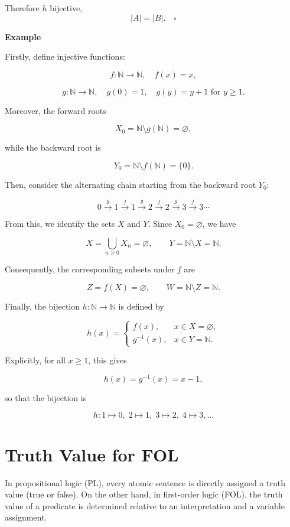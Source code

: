 \documentclass[12pt,a4paper,openany]{article}
\begin{document}
Therefore $h$ bijective,  
\[
|A|=|B|. \quad \square
\]

\textbf{Example}

Firstly, define injective functions:

\[
f: \mathbb{N} \to \mathbb{N}, \quad f(x) = x,
\]

\[
g: \mathbb{N} \to \mathbb{N}, \quad g(0) = 1, \quad g(y) = y+1 \text{ for } y \ge 1.
\]

Moreover, the forward roots

\[
X_0 = \mathbb{N} \setminus g(\mathbb{N}) = \varnothing,
\]

while the backward root is

\[
Y_0 = \mathbb{N} \setminus f(\mathbb{N}) = \{0\}.
\]

Then, consider the alternating chain starting from the backward root $Y_0$:

\[
0 \xrightarrow{\,g\,} 1 \xrightarrow{\,f\,} 1 \xrightarrow{\,g\,} 2 \xrightarrow{\,f\,} 2 \xrightarrow{\,g\,} 3 \xrightarrow{\,f\,} 3 \cdots
\]

From this, we identify the sets $X$ and $Y$. Since $X_0 = \varnothing$, we have

\[
X = \bigcup_{n\ge 0} X_n = \varnothing, \qquad
Y = \mathbb{N} \setminus X = \mathbb{N}.
\]

Consequently, the corresponding subsets under $f$ are

\[
Z = f(X) = \varnothing, \qquad W = \mathbb{N} \setminus Z = \mathbb{N}.
\]

Finally, the bijection $h: \mathbb{N} \to \mathbb{N}$ is defined by

\[
h(x) =
\begin{cases}
f(x), & x \in X = \varnothing,\\[1mm]
g^{-1}(x), & x \in Y = \mathbb{N}.
\end{cases}
\]

Explicitly, for all $x \ge 1$, this gives

\[
h(x) = g^{-1}(x) = x-1,
\]

so that the bijection is

\[
h: 1 \mapsto 0, \; 2 \mapsto 1, \; 3 \mapsto 2, \; 4 \mapsto 3, \dots
\]

\section{Truth Value for FOL}

In propositional logic (PL), every atomic sentence is directly assigned
a truth value (true or false). On the other hand, in first-order logic
(FOL), the truth value of a predicate is determined relative to an
interpretation and a variable assignment.
\end{document}
